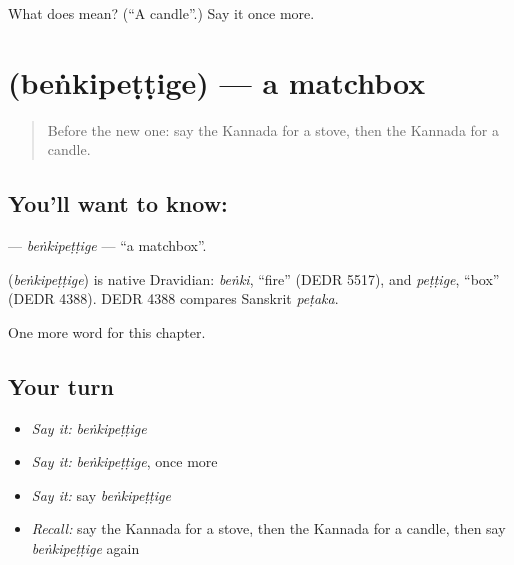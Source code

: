 \begin{tcolorbox}[breakable,colback=teal!4,colframe=teal!35!black,title={Before you move on}]
What does  mean? (\textquotedblleft{}A candle\textquotedblright{}.) Say it once more.
\end{tcolorbox}
\section[\texorpdfstring{\kn{ಬೆಂಕಿಪೆಟ್ಟಿಗೆ} (beṅkipeṭṭige)}{ಬೆಂಕಿಪೆಟ್ಟಿಗೆ (beṅkipeṭṭige)}]{ (beṅkipeṭṭige) — a matchbox}

\label{lesson:KA-C119-benkipettige}



\begin{quote}
Before the new one: say the Kannada for a stove, then the Kannada for a candle.
\end{quote}

\subsection*{You'll want to know: }
\textbf{} — \emph{beṅkipeṭṭige} — \textquotedblleft{}a matchbox\textquotedblright{}.

\begin{cousinweb}
\textbf{} (\emph{beṅkipeṭṭige}) is native Dravidian: \emph{beṅki}, \textquotedblleft{}fire\textquotedblright{} (DEDR 5517), and \emph{peṭṭige}, \textquotedblleft{}box\textquotedblright{} (DEDR 4388). DEDR 4388 compares Sanskrit \emph{peṭaka}.
\end{cousinweb}

\begin{grammarlens}[title={What you've built}]
One more word for this chapter.
\end{grammarlens}

\subsection*{Your turn}
\begin{itemize}
\raggedright
  \item \emph{Say it:} \emph{beṅkipeṭṭige}
  \item \emph{Say it:} \emph{beṅkipeṭṭige}, once more
  \item \emph{Say it:} say \emph{beṅkipeṭṭige}
  \item \emph{Recall:} say the Kannada for a stove, then the Kannada for a candle, then say \emph{beṅkipeṭṭige} again
\end{itemize}

